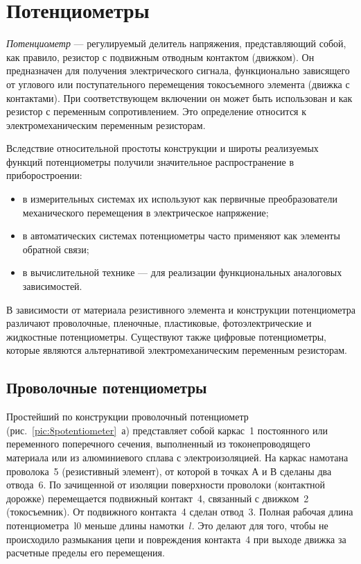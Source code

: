 \chapter{Потенциометры}

\textit{Потенциометр} --- регулируемый делитель напряжения, представляющий собой, как правило, резистор с подвижным отводным контактом (движком). Он предназначен для получения электрического сигнала, функционально зависящего от углового или поступательного перемещения токосъемного элемента (движка с контактами). При соответствующем включении он может быть использован и как резистор с переменным сопротивлением. Это определение относится к электромеханическим переменным резисторам.

Вследствие относительной простоты конструкции и широты реализуемых функций потенциометры получили значительное распространение в приборостроении: 
\begin{itemize}
	\item в измерительных системах их используют как первичные преобразователи механического перемещения в электрическое напряжение;
	\item в автоматических системах потенциометры часто применяют как элементы обратной связи;
	\item в вычислительной технике --- для реализации функциональных аналоговых зависимостей.
\end{itemize}

В зависимости от материала резистивного элемента и конструкции потенциометра различают проволочные, пленочные, пластиковые, фотоэлектрические и жидкостные потенциометры. Существуют также цифровые потенциометры, которые являются альтернативой электромеханическим переменным резисторам.

\section{Проволочные потенциометры}

Простейший по конструкции проволочный потенциометр (рис.~\ref{pic:8potentiometer}~а) представляет собой каркас~1 постоянного или переменного поперечного сечения, выполненный из токонепроводящего материала или из алюминиевого сплава с электроизоляцией. На каркас намотана проволока~5 (резистивный элемент), от которой в точках А и В сделаны два отвода~6. По зачищенной от изоляции поверхности проволоки (контактной дорожке) перемещается подвижный контакт~4, связанный с движком~2 (токосъемник). От подвижного контакта~4 сделан отвод~3. Полная рабочая длина потенциометра~l0 меньше длины намотки~$ l $. Это делают для того, чтобы не происходило размыкания цепи и повреждения контакта~4 при выходе движка за расчетные пределы его перемещения.

